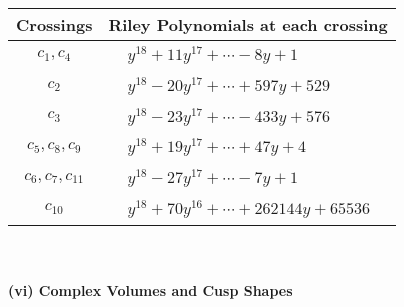 \documentclass[1p]{elsarticle_modified}
\theoremstyle{definition}
\begin{document}
\begin{tabular}{m{50pt}|m{274pt}}
Crossings & \hspace{64pt}Riley Polynomials at each crossing \\
\hline $$\begin{aligned}c_{1},c_{4}\end{aligned}$$&$\begin{aligned}
&y^{18}+11 y^{17}+\cdots-8 y+1
\end{aligned}$\\
\hline $$\begin{aligned}c_{2}\end{aligned}$$&$\begin{aligned}
&y^{18}-20 y^{17}+\cdots+597 y+529
\end{aligned}$\\
\hline $$\begin{aligned}c_{3}\end{aligned}$$&$\begin{aligned}
&y^{18}-23 y^{17}+\cdots-433 y+576
\end{aligned}$\\
\hline $$\begin{aligned}c_{5},c_{8},c_{9}\end{aligned}$$&$\begin{aligned}
&y^{18}+19 y^{17}+\cdots+47 y+4
\end{aligned}$\\
\hline $$\begin{aligned}c_{6},c_{7},c_{11}\end{aligned}$$&$\begin{aligned}
&y^{18}-27 y^{17}+\cdots-7 y+1
\end{aligned}$\\
\hline $$\begin{aligned}c_{10}\end{aligned}$$&$\begin{aligned}
&y^{18}+70 y^{16}+\cdots+262144 y+65536
\end{aligned}$\\
\hline
\end{tabular}\\~\\
\newpage\flushleft \textbf{(vi) Complex Volumes and Cusp Shapes}
\end{document}
